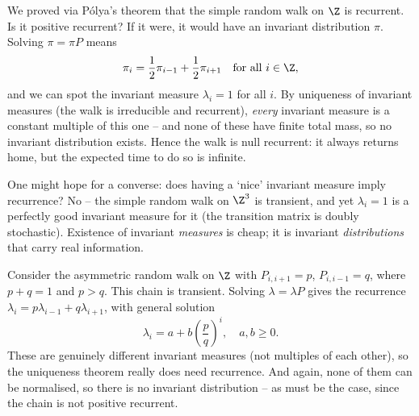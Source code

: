 \documentclass[a4paper]{scrartcl}
\begin{document}
\begin{example}
	We proved via Pólya's theorem that the simple random walk on $\Z$ is recurrent. Is it positive recurrent? If it were, it would have an invariant distribution $\pi$. Solving $\pi = \pi P$ means
	$$
	\pi_i = \frac{1}{2}\pi_{i - 1} + \frac{1}{2}\pi_{i + 1} \quad \text{for all } i \in \Z,
	$$
	and we can spot the invariant measure $\lambda_i = 1$ for all $i$. By uniqueness of invariant measures (the walk is irreducible and recurrent), \emph{every} invariant measure is a constant multiple of this one -- and none of these have finite total mass, so no invariant distribution exists. Hence the walk is null recurrent: it always returns home, but the expected time to do so is infinite.
\end{example}

\begin{remark}
	One might hope for a converse: does having a `nice' invariant measure imply recurrence? No -- the simple random walk on $\Z^3$ is transient, and yet $\lambda_i = 1$ is a perfectly good invariant measure for it (the transition matrix is doubly stochastic). Existence of invariant \emph{measures} is cheap; it is invariant \emph{distributions} that carry real information.
\end{remark}

\begin{example}
	Consider the asymmetric random walk on $\Z$ with $P_{i, i + 1} = p$, $P_{i, i - 1} = q$, where $p + q = 1$ and $p > q$. This chain is transient. Solving $\lambda = \lambda P$ gives the recurrence $\lambda_i = p\lambda_{i - 1} + q \lambda_{i + 1}$, with general solution
	$$
	\lambda_i = a + b \left(\frac{p}{q}\right)^i, \quad a, b \geq 0.
	$$
	These are genuinely different invariant measures (not multiples of each other), so the uniqueness theorem really does need recurrence. And again, none of them can be normalised, so there is no invariant distribution -- as must be the case, since the chain is not positive recurrent.
\end{example}
\end{document}
